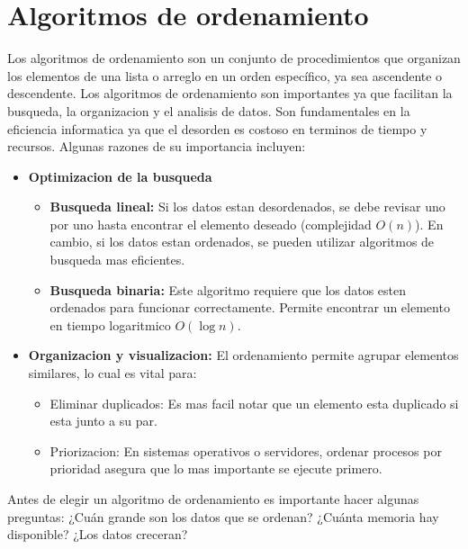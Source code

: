 \documentclass[9pt,letterpaper,onecolumn]{rho-class/rho}
\begin{document}
\section{Algoritmos de ordenamiento}
    Los algoritmos de ordenamiento son un conjunto de procedimientos que organizan los elementos de una lista o arreglo en un orden 
    específico, ya sea ascendente o descendente.
    Los algoritmos de ordenamiento son importantes ya que facilitan la busqueda, la organizacion y el analisis de datos. Son fundamentales
    en la eficiencia informatica ya que el desorden es costoso en terminos de tiempo y recursos. Algunas razones de su importancia incluyen:
    \begin{itemize}
        \item \textbf{Optimizacion de la busqueda}
            \begin{itemize}
                \item \textbf{Busqueda lineal:} Si los datos estan desordenados, se debe revisar uno por uno hasta encontrar el elemento deseado (complejidad $O(n)$). 
                En cambio, si los datos estan ordenados, se pueden utilizar algoritmos de busqueda mas eficientes.
                \item \textbf{Busqueda binaria:} Este algoritmo requiere que los datos esten ordenados para funcionar correctamente. 
                Permite encontrar un elemento en tiempo logaritmico $O(\log n)$.
            \end{itemize}
        \item \textbf{Organizacion y visualizacion:} El ordenamiento permite agrupar elementos similares, lo cual es vital para:
            \begin{itemize}
                \item Eliminar duplicados: Es mas facil notar que un elemento esta duplicado si esta junto a su par.
                \item Priorizacion: En sistemas operativos o servidores, ordenar procesos por prioridad asegura que lo mas importante se ejecute primero.
            \end{itemize} 
    \end{itemize}

    \begin{info}
        Antes de elegir un algoritmo de ordenamiento es importante hacer algunas preguntas: ¿Cuán grande son los datos que se ordenan?
        ¿Cuánta memoria hay disponible? ¿Los datos creceran?
    \end{info}
        
\end{document}
